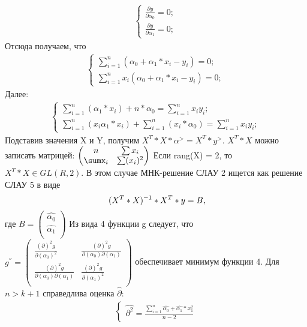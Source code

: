 \documentclass[__main__.tex]{subfiles}
\begin{document}
\begin{gather}
	\begin{cases}
		\frac{\partial y}{\partial  \alpha_0} = 0;\\
		\frac{\partial y}{\partial  \alpha_1} = 0;
	\end{cases}
\end{gather}
Отсюда получаем, что
\begin{gather}
	\begin{cases}
	 \sum_{i=1}^{n}(\alpha_0 + \alpha_1 * x_i - y_i) = 0;\\
	 \sum_{i=1}^{n} x_i (\alpha_0 + \alpha_1 * x_i - y_i) = 0;
	\end{cases}
\end{gather}
Далее:
\begin{gather}
	\begin{cases}
	\sum_{i=1}^{n}(\alpha_1 * x_i) + n*\alpha_0 = \sum_{i=1}^{n}x_i y_i;\\
	\sum_{i=1}^{n}(x_i   \alpha_1 * x_i) + \sum_{i=1}^{n}(x_i * \alpha_0) = \sum_{i=1}^{n} x_i y_i;
\end{cases}
\end{gather}
Подставив значения X и Y, получим $X^{T}*X*\alpha^{>} = X^{T}*y^{>}$. $X^{T}*X$ можно записать матрицей:
 $\left(
\begin{matrix}
n & \sum x_i\\
\sumx_i  & \sum (x_i)^2\\
\end{matrix}
\right)$
Если rang(X) = 2, то $X^{T}*X \in GL(R,2)$. В этом случае МНК-решение СЛАУ 2 ищется как решение СЛАУ 5 в виде 
\begin{equation}
\ (X^{T}*X)^{-1} *X^{T}*y  = B,
\llabel{eq:6}
\end{equation}
где $B = \left(
\begin{matrix}
\hat{\alpha_0} \\
\hat{\alpha_1}\\
\end{matrix}
\right)$
Из вида 4 функции g следует, что $g^{''} = \left(
\begin{matrix}
\frac{(\partial)^2 g}{\partial  (\alpha_0)^2} & \frac{(\partial)^2 g}{\partial(\alpha_0)\partial (\alpha_1)} \\
\frac{(\partial)^2 g}{\partial(\alpha_0)\partial (\alpha_1)} & \frac{(\partial)^2 g}{\partial  (\alpha_1)^2}\\
\end{matrix}
\right)$ обеспечивает минимум функции 4.
Для $n > k+1$ справедлива оценка $\hat{\partial}$:
 \begin{gather}
 	\begin{cases}
 		\hat{\partial^2} = \frac{\sum_{i=1}^{n}\hat{\alpha_0} + \hat{\alpha_1}*x_1^2}{n-2}
 	\end{cases}
 \end{gather}
\end{document}
